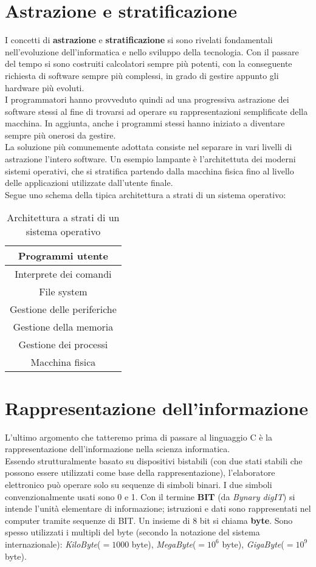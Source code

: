 \section{Astrazione e stratificazione}
I concetti di \textbf{astrazione} e \textbf{stratificazione} si sono rivelati fondamentali nell'evoluzione dell'informatica e nello sviluppo della tecnologia. Con il passare del tempo si sono costruiti calcolatori sempre più potenti, con la conseguente richiesta di software sempre più complessi, in grado di gestire appunto gli hardware più evoluti.\\
I programmatori hanno provveduto quindi ad una progressiva astrazione dei software stessi al fine di trovarsi ad operare su rappresentazioni semplificate della macchina. In aggiunta, anche i programmi stessi hanno iniziato a diventare sempre più onerosi da gestire.\\
La soluzione più comunemente adottata consiste nel separare in vari livelli di astrazione l'intero software. Un esempio lampante è l'architettuta dei moderni sistemi operativi, che si stratifica partendo dalla macchina fisica fino al livello delle applicazioni utilizzate dall'utente finale.\\
Segue uno schema della tipica architettura a strati di un sistema operativo:
\begin{table}[!ht]
	\centering
	\label{Strati-OS}
	\begin{tabular}{c}
		\hline
		Programmi utente           \\ \hline
		Interprete dei comandi     \\ \hline
		File system                \\ \hline
		Gestione delle periferiche \\ \hline
		Gestione della memoria     \\ \hline
		Gestione dei processi      \\ \hline
		Macchina fisica            \\ \hline
	\end{tabular}
\caption{Architettura a strati di un sistema operativo}
\end{table}

\section{Rappresentazione dell'informazione}
L'ultimo argomento che tatteremo prima di passare al linguaggio C è la rappresentazione dell'informazione nella scienza informatica.\\
Essendo strutturalmente basato su dispositivi bistabili (con due stati stabili che possono essere utilizzati come base della rappresentazione), l'elaboratore elettronico può operare solo su sequenze di simboli binari. I due simboli convenzionalmente usati sono 0 e 1. Con il termine \textbf{BIT} (da \textit{Bynary digIT}) si intende l’unità elementare di informazione; istruzioni e dati sono rappresentati nel computer tramite sequenze di BIT. Un insieme di 8 bit si chiama \textbf{byte}. Sono spesso utilizzati i multipli del byte (secondo la notazione del sistema internazionale): \textit{KiloByte}($=1000$ byte), \textit{MegaByte}($=10^{6}$ byte), \textit{GigaByte}($=10^{9}$ byte).


